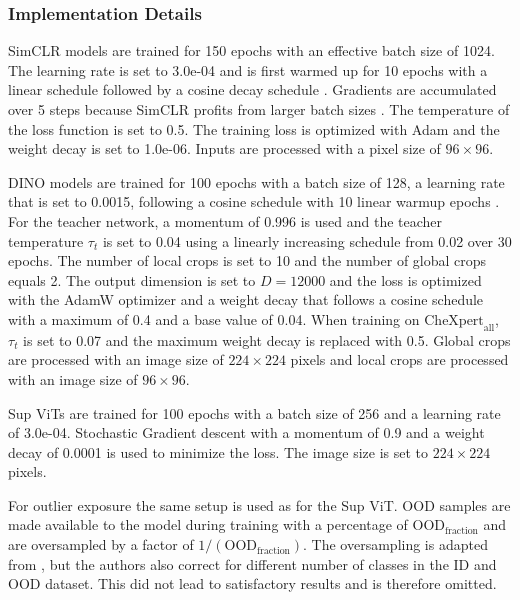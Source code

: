 \subsubsection{Implementation Details}
SimCLR models are trained for 150 epochs with an effective batch size of 1024.
The learning rate is set to 3.0e-04 and is first warmed up for 10 epochs with a linear schedule \citep{Goyal2017} followed by a cosine decay schedule \citep{Chen2020,Loshchilov2016}. 
Gradients are accumulated over 5 steps because SimCLR profits from larger batch sizes \citep{Chen2020}.
The temperature of the loss function is set to 0.5. 
The training loss is optimized with Adam \citep{Kingma2014} and the weight decay is set to 1.0e-06.
Inputs are processed with a pixel size of $96\times96$.
\par
DINO models are trained for 100 epochs with a batch size of 128, a learning rate that is set to 0.0015, following a cosine schedule \citep{Caron2021,Loshchilov2016} with 10 linear warmup epochs \citep{Goyal2017}.
For the teacher network, a momentum of 0.996 is used and the teacher temperature $\tau_t$ is set to 0.04 using a linearly increasing schedule from 0.02 over 30 epochs.
The number of local crops is set to 10 and the number of global crops equals 2.
The output dimension is set to $D=12000$ and the loss is optimized with the AdamW optimizer \citep{Loshchilov2018} and a weight decay that follows a cosine schedule with a maximum of 0.4 and a base value of 0.04.
When training on $\text{CheXpert}_\text{all}$, $\tau_t$ is set to 0.07 and the maximum weight decay is replaced with 0.5.
Global crops are processed with an image size of $224\times224$ pixels and local crops are processed with an image size of $96\times96$.
\par
Sup ViTs are trained for 100 epochs with a batch size of 256 and a learning rate of 3.0e-04. 
Stochastic Gradient descent with a momentum of 0.9 and a weight decay of 0.0001 is used to minimize the loss.
The image size is set to $224\times224$ pixels.
\par
For outlier exposure the same setup is used as for the Sup ViT.
OOD samples are made available to the model during training with a percentage of $\text{OOD}_\text{fraction}$ and are oversampled by a factor of $1/(\text{OOD}_\text{fraction})$.
The oversampling is adapted from \citep{Fort2021}, but the authors also correct for different number of classes in the ID and OOD dataset.
This did not lead to satisfactory results and is therefore omitted.
